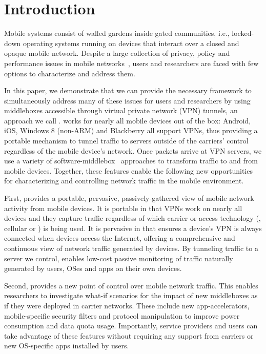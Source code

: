 \section{Introduction}
\label{sec:introduction}

Mobile systems consist of walled gardens inside gated 
communities, i.e., locked-down operating systems running on 
devices that interact over a closed and opaque mobile network. 
Despite a large collection of privacy, policy and performance issues
in mobile networks~\cite{enck:taintdroid,hornyack:appfence,speedtest,eprof},
users and researchers are faced with few options to  
characterize and address them.

In this paper, we demonstrate that we can provide the necessary framework to
simultaneously address many of these issues for users and researchers by using
middleboxes accessible through virtual private network (VPN) tunnels, an approach we call
\meddle.  \meddle works for nearly all mobile devices out of the box:
Android, iOS, Windows 8 (non-ARM) and Blackberry all support VPNs, thus providing a
portable mechanism to tunnel traffic to servers outside of the
carriers' control regardless of the mobile device's network.  Once
packets arrive at VPN servers, we use a variety of software-middlebox~\cite{sherry:middleboxes}
approaches to transform traffic to and from mobile devices. Together, 
these features enable the following new opportunities for characterizing and 
controlling network traffic in the mobile environment.

First, \meddle provides a portable, pervasive, passively-gathered view of mobile network activity 
from mobile devices. It is portable in that VPNs work on nearly all 
devices and they capture traffic regardless of which carrier or access technology (\eg, 
cellular or \wifi) is being used. It is pervasive in that \meddle ensures a 
device's VPN is always connected when devices access the Internet, offering 
a comprehensive and continuous view of network traffic generated by devices. By tunneling traffic to a server we control, \meddle enables low-cost passive monitoring 
of traffic naturally generated by users, OSes and apps on their own devices.

Second, \meddle provides a new point of control over mobile 
network traffic. This  
enables researchers to investigate what-if scenarios for the 
impact of new middleboxes as if they were deployed in carrier 
networks. These include new app-accelerators, 
mobile-specific security filters and protocol manipulation 
to improve power consumption and data quota usage. Importantly, 
service providers and users can take advantage of these features 
without requiring any support from carriers or new OS-specific 
apps installed by users.

